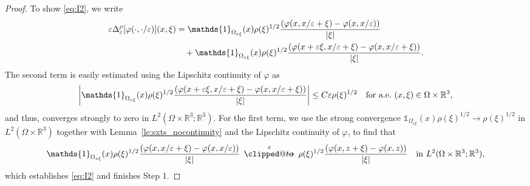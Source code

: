 \documentclass[reqno,11pt]{amsart}
\makeatletter
\numberwithin{equation}{section}
\theoremstyle{thmlemcorr}
\numberwithin{theorem}{section}
\theoremstyle{thmlemcorr*}
\theoremstyle{defi}
\theoremstyle{remexample}
\theoremstyle{ass}
\newcommand{\R}{\mathbb{R}}
\renewcommand{\epsilon}{\varepsilon}
\newcommand{\dd}{\,\mathrm{d}}
\DeclarePairedDelimiter{\abs}{\lvert}{\rvert}
\DeclarePairedDelimiter{\norm}{\lVert}{\rVert}
\newcommand{\1}{\mathds{1}}
\DeclareMathOperator{\supp}{supp}
\DeclareRobustCommand{\twoscale}{%
  \clippedto\mathrel{\mspace{-15mu}}\to
}
\newcommand{\clippedto}{%
  \mathrel{\mathpalette\clipped@to\relax}%
}
\newcommand{\clipped@to}[2]{%
  \sbox\z@{$\m@th#1\mspace{6mu}$}%
  \clipbox{0pt 0pt {\dimexpr\width-.5\wd\z@} 0pt}{$\m@th#1\to$}%
  \smash{\clipbox{{\wd\z@} 0pt 0pt {-\width}}{$\m@th#1\to$}}%
}
\newcommand{\xtwoscale}{\overset{x}{\twoscale}}
\newcommand{\Om}{\Omega}
\newcommand{\veps}{\varepsilon}
\newcommand{\ROSS}[1]{{\textcolor{blue}{$\langle\hspace{-0.3ex}\langle$Ross: #1$\rangle\hspace{-0.3ex}\rangle$}}}
\makeatother
\begin{document}
\begin{proof}
    To show \eqref{eq:I2}, we write
    \begin{align*}
        \veps \Delta_\epsilon^\rho[\varphi(\cdot,\cdot/\epsilon)](x,\xi) &= \mathds{1}_{\Omega_{\epsilon\xi}}(x)\rho(\xi)^{1/2}\frac{(\varphi(x,x/\epsilon+\xi)-\varphi(x,x/\epsilon))}{\abs{\xi}} \\
        &\quad+ \mathds{1}_{\Omega_{\epsilon\xi}}(x)\rho(\xi)^{1/2}\frac{(\varphi(x+\epsilon\xi,x/\epsilon+\xi)-\varphi(x,x/\epsilon+\xi))}{\abs{\xi}}.
    \end{align*}
    The second term is easily estimated using the Lipschitz continuity of $\varphi$ as
    \[
    \abs*{\mathds{1}_{\Omega_{\epsilon\xi}}(x)\rho(\xi)^{1/2}\frac{(\varphi(x+\epsilon\xi,x/\epsilon+\xi)-\varphi(x,x/\epsilon+\xi))}{\abs{\xi}}} \leq C\epsilon \rho(\xi)^{1/2} \quad \text{for a.e.~$(x,\xi) \in \Omega \times \R^3$,}
    \]
    and thus, converges strongly to zero in $L^2(\Omega \times \R^3;\R^3)$. For the first term, we use the strong convergence $\mathds{1}_{\Omega_{\epsilon\xi}}(x)\rho(\xi)^{1/2} \to \rho(\xi)^{1/2}$ in $L^2(\Omega\times\R^3)$ together with Lemma~\ref{le:sxts_nocontinuity} and the Lipschitz continuity of $\varphi$, to find that
    \[
    \mathds{1}_{\Omega_{\epsilon\xi}}(x)\rho(\xi)^{1/2}\frac{(\varphi(x,x/\epsilon+\xi)-\varphi(x,x/\epsilon))}{\abs{\xi}} \, \xtwoscale \,\rho(\xi)^{1/2}\frac{(\varphi(x,z+\xi)-\varphi(x,z))}{\abs{\xi}} \quad \text{in $L^2(\Omega\times\R^3;\R^3)$},
    \]
    which establishes \eqref{eq:I2} and finishes Step 1.



\end{proof}
\end{document}
